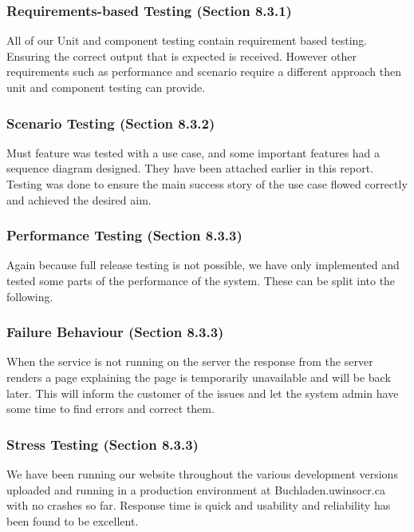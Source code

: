 \documentclass[11pt]{article}
\begin{document}
		\subsubsection{Requirements-based Testing (Section 8.3.1)}

			All of our Unit and component testing contain requirement based testing. 
			Ensuring the correct output that is expected is received. 
			However other requirements such as performance and scenario require a different approach then unit and component testing can provide.

		\subsubsection{Scenario Testing (Section 8.3.2)}

			Must feature was tested with a use case, and some important features had a sequence diagram designed. 
			They have been attached earlier in this report. 
			Testing was done to ensure the main success story of the use case flowed correctly and achieved the desired aim.

		\subsubsection{Performance Testing (Section 8.3.3)}

			Again because full release testing is not possible, we have only implemented and tested some parts of the performance of the system. 
			These can be split into the following.

		\subsubsection{Failure Behaviour (Section 8.3.3)}

			When the service is not running on the server the response from the server renders a page explaining the page is temporarily unavailable and will be back later. 
			This will inform the customer of the issues and let the system admin have some time to find errors and correct them.

		\subsubsection{Stress Testing (Section 8.3.3)}

			We have been running our website throughout the various development versions uploaded and running in a production environment at Buchladen.uwinsocr.ca with no crashes so far. 
			Response time is quick and usability and reliability has been found to be excellent. 
\end{document}
